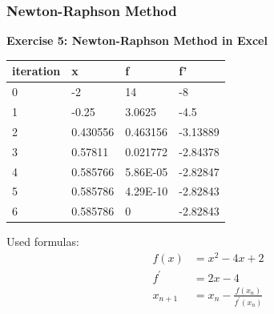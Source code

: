 \begin{frame}[fragile]
    \frametitle{Newton-Raphson Method}

    \textbf{Exercise 5: Newton-Raphson Method in Excel}
    \begin{table}[]
      \begin{tabular}{|l|l|l|l|}
      \hline
      iteration & x        & f        & f'       \\ \hline
      0         & -2       & 14       & -8       \\ \hline
      1         & -0.25    & 3.0625   & -4.5     \\ \hline
      2         & 0.430556 & 0.463156 & -3.13889 \\ \hline
      3         & 0.57811  & 0.021772 & -2.84378 \\ \hline
      4         & 0.585766 & 5.86E-05 & -2.82847 \\ \hline
      5         & 0.585786 & 4.29E-10 & -2.82843 \\ \hline
      6         & 0.585786 & 0        & -2.82843 \\ \hline
      \end{tabular}
      \end{table}

      Used formulas:
      \begin{align*}
      f(x) &= x^2 - 4x + 2\\
      f^\prime &= 2x - 4\\
      x_{n+1} &= x_n - \frac{f(x_n)}{f^\prime(x_n)}
      \end{align*}
\end{frame}


